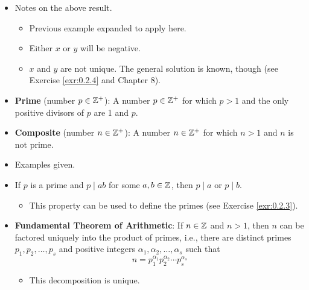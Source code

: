 \documentclass[../notes.tex]{subfiles}
\begin{document}
\begin{itemize}
    \begin{equation*}
        (a,b) = ax+by
    \end{equation*}
    \begin{proof}
        Exploit the Euclidean Algorithm. Use the second-to-last line to write $(a,b)$ in terms of $r_{n-1},r_{n-2}$:
        \begin{equation*}
            r_n = r_{n-2}-q_nr_{n-1}
        \end{equation*}
        Then use $r_{n-1}=r_{n-3}-q_{n-1}r_{n-2}$ to express $r_n$ in terms of $r_{n-2},r_{n-3}$. Go back and back until we express $r_n$ in terms of $a,b$, and then combine terms.
    \end{proof}
    \item Notes on the above result.
    \begin{itemize}
        \item Previous example expanded to apply here.
        \item Either $x$ or $y$ will be negative.
        \item $x$ and $y$ are not unique. The general solution is known, though (see Exercise \ref{exr:0.2.4} and Chapter 8).
    \end{itemize}
    \item \textbf{Prime} (number $p\in\mathbb{Z}^+$): A number $p\in\mathbb{Z}^+$ for which $p>1$ and the only positive divisors of $p$ are 1 and $p$.
    \item \textbf{Composite} (number $n\in\mathbb{Z}^+$): A number $n\in\mathbb{Z}^+$ for which $n>1$ and $n$ is not prime.
    \item Examples given.
    \item If $p$ is a prime and $p\mid ab$ for some $a,b\in\mathbb{Z}$, then $p\mid a$ or $p\mid b$.
    \begin{itemize}
        \item This property can be used to define the primes (see Exercise \ref{exr:0.2.3}).
    \end{itemize}
    \item \textbf{Fundamental Theorem of Arithmetic}: If $n\in\mathbb{Z}$ and $n>1$, then $n$ can be factored uniquely into the product of primes, i.e., there are distinct primes $p_1,p_2,\dots,p_s$ and positive integers $\alpha_1,\alpha_2,\dots,\alpha_s$ such that
    \begin{equation*}
        n = p_1^{\alpha_1}p_2^{\alpha_2}\cdots p_s^{\alpha_s}
    \end{equation*}
    \begin{itemize}
        \item This decomposition is unique.

\end{itemize}
\end{itemize}
\end{document}
